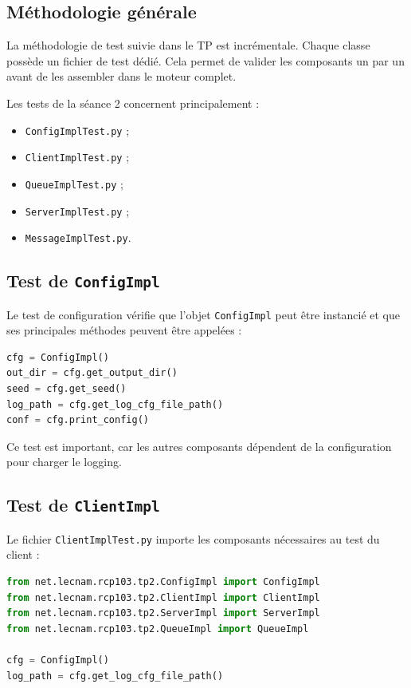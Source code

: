 \documentclass{article}
\begin{document}
\subsection{Méthodologie générale}

La méthodologie de test suivie dans le TP est incrémentale. Chaque classe possède un fichier de test dédié. Cela permet de valider les composants un par un avant de les assembler dans le moteur complet.

Les tests de la séance 2 concernent principalement :
\begin{itemize}[leftmargin=*]
    \item \texttt{ConfigImplTest.py} ;
    \item \texttt{ClientImplTest.py} ;
    \item \texttt{QueueImplTest.py} ;
    \item \texttt{ServerImplTest.py} ;
    \item \texttt{MessageImplTest.py}.
\end{itemize}

\subsection{Test de \texttt{ConfigImpl}}

Le test de configuration vérifie que l’objet \texttt{ConfigImpl} peut être instancié et que ses principales méthodes peuvent être appelées :

\begin{lstlisting}[language=Python, caption=Extrait de ConfigImplTest.py]
cfg = ConfigImpl()
out_dir = cfg.get_output_dir()
seed = cfg.get_seed()
log_path = cfg.get_log_cfg_file_path()
conf = cfg.print_config()
\end{lstlisting}

Ce test est important, car les autres composants dépendent de la configuration pour charger le logging.

\subsection{Test de \texttt{ClientImpl}}

Le fichier \texttt{ClientImplTest.py} importe les composants nécessaires au test du client :

\begin{lstlisting}[language=Python, caption=Extrait de ClientImplTest.py]
from net.lecnam.rcp103.tp2.ConfigImpl import ConfigImpl
from net.lecnam.rcp103.tp2.ClientImpl import ClientImpl
from net.lecnam.rcp103.tp2.ServerImpl import ServerImpl
from net.lecnam.rcp103.tp2.QueueImpl import QueueImpl

cfg = ConfigImpl()
log_path = cfg.get_log_cfg_file_path()
\end{lstlisting}
\end{document}
